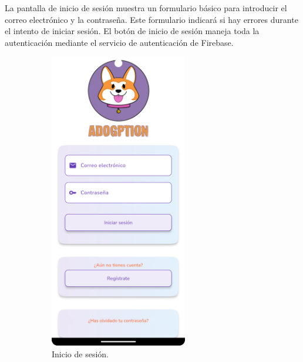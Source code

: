 \documentclass[a4paper, 12pt]{article}
\begin{document}
La pantalla de inicio de sesión muestra un formulario básico para introducir el correo electrónico y la contraseña. Este formulario indicará si hay errores durante el intento de iniciar sesión. El botón de inicio de sesión maneja toda la autenticación mediante el servicio de autenticación de Firebase.

\begin{figure}[H]
   	\begin{subfigure}{0.48\textwidth}
		\begin{center}
			{\includegraphics[width=6cm]{app/Login.png}\par}
			\caption{Inicio de sesión.}
		\end{center}  
	\end{subfigure}\hfill
   	\begin{subfigure}{0.48\textwidth}
		\begin{center}

\end{center}
\end{subfigure}
\end{figure}
\end{document}
